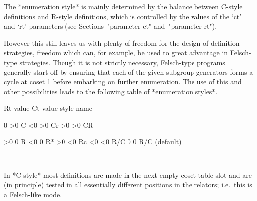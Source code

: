 \endlist

The *enumeration  style* is mainly  determined by the  balance between
C-style definitions  and R-style  definitions, which is  controlled by
the values of the `ct' and `rt' parameters (see Sections~"parameter ct"
and~"parameter rt").

However this still leaves us with  plenty of freedom for the design of
definition  strategies,  freedom which  can, for example,  be  used to
great advantage in Felsch-type strategies. Though it is  not  strictly
necessary, Felsch-type  programs generally start off  by ensuring that
each of the given subgroup generators  forms a cycle at coset 1 before
embarking  on   further  enumeration.  The  use  of   this  and  other
possibilities leads to the following table of *enumeration styles*.


\begintt
Rt value     Ct value     style name
---------------------------------------

   0           >0         C
  <0           >0         Cr
  >0           >0         CR

  >0            0         R
  <0            0         R*
  >0           <0         Rc
  <0           <0         R/C
   0            0         R/C (default)

---------------------------------------
\endtt

In *C-style*  most definitions are made in the  next empty coset table
slot  and  are (in  principle)  tested  in  all essentially  different
positions in the relators; i.e.~this is a Felsch-like mode.

